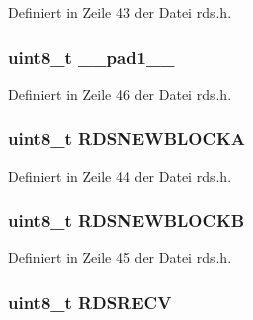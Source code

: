 Definiert in Zeile 43 der Datei rds.\+h.

\hypertarget{structinfo_a77f12d2e278bd5c07712648ac0df5e08}{}
\subsubsection[{\+\_\+\+\_\+pad1\+\_\+\+\_\+}]{\setlength{\rightskip}{0pt plus 5cm}uint8\+\_\+t \+\_\+\+\_\+pad1\+\_\+\+\_\+}\label{structinfo_a77f12d2e278bd5c07712648ac0df5e08}


Definiert in Zeile 46 der Datei rds.\+h.

\hypertarget{structinfo_a62260ece65dc68c2467e5e1b09e5f144}{}
\subsubsection[{R\+D\+S\+N\+E\+W\+B\+L\+O\+C\+K\+A}]{\setlength{\rightskip}{0pt plus 5cm}uint8\+\_\+t R\+D\+S\+N\+E\+W\+B\+L\+O\+C\+K\+A}\label{structinfo_a62260ece65dc68c2467e5e1b09e5f144}


Definiert in Zeile 44 der Datei rds.\+h.

\hypertarget{structinfo_acd71c83a87b1a99a4784dad5f2a9477f}{}
\subsubsection[{R\+D\+S\+N\+E\+W\+B\+L\+O\+C\+K\+B}]{\setlength{\rightskip}{0pt plus 5cm}uint8\+\_\+t R\+D\+S\+N\+E\+W\+B\+L\+O\+C\+K\+B}\label{structinfo_acd71c83a87b1a99a4784dad5f2a9477f}


Definiert in Zeile 45 der Datei rds.\+h.

\hypertarget{structinfo_a56e25cd5c95053ebd95c3c35654680d6}{}
\subsubsection[{R\+D\+S\+R\+E\+C\+V}]{\setlength{\rightskip}{0pt plus 5cm}uint8\+\_\+t R\+D\+S\+R\+E\+C\+V}\label{structinfo_a56e25cd5c95053ebd95c3c35654680d6}


